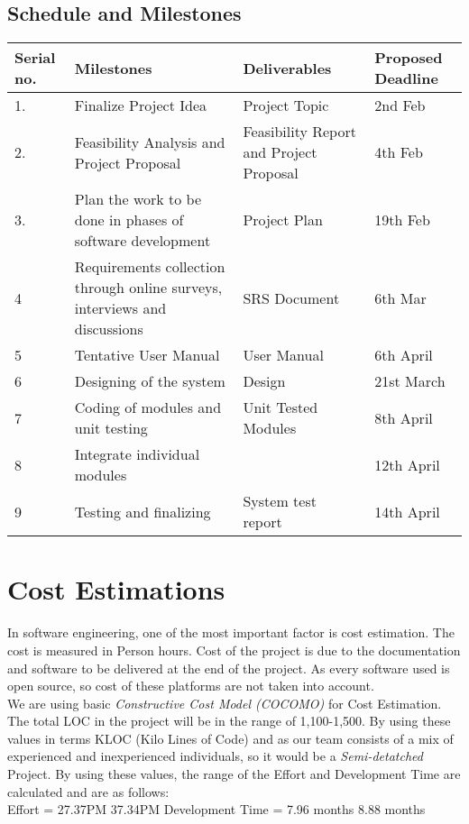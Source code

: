 \documentclass[
10pt, %
a4paper, %
oneside, %
headinclude,footinclude, %
BCOR5mm, %
]{scrartcl}
\begin{document}
\subsection{ Schedule and Milestones}
\begin{table}[htbp]
\setlength\tabcolsep{1pt}
\begin{tabular}{|| p{1cm}| p{6cm}| p{4cm}| p{3cm}||}
 \hline
Serial no. & Milestones & 	Deliverables & Proposed Deadline   \\ [1.5ex] 
 \hline\hline
 1. &	Finalize Project Idea &	Project Topic &	2nd Feb\\ 
 \hline
 2. &	Feasibility Analysis and Project Proposal &	Feasibility Report and Project Proposal	& 4th Feb \\
 \hline
 3. & Plan the work to be done in 
 phases of software development	& Project Plan & 19th Feb \\
 \hline
4 &	Requirements collection through online surveys, interviews and discussions
& SRS Document & 6th Mar \\
 \hline
5 &	Tentative User Manual &	User Manual	& 6th April\\
\hline
6 &	Designing of the system &	Design &	21st March\\
\hline
7 &	Coding of modules and unit testing & Unit Tested Modules &	8th April\\
\hline
8 &	Integrate individual modules	& &	12th April\\
\hline
9 &	Testing and finalizing &	System test report &	14th April\\[1ex] 
 \hline
\end{tabular}

\end{table}

\section{Cost Estimations}
In software engineering, one of the most important factor is cost estimation. The cost is measured in Person hours. Cost of the project is due to the documentation and software to be delivered at the end of the project. As every software used is open source, so cost of these platforms are not taken into account.\vspace{0.5cm}\\ We are using basic \textit{Constructive Cost Model (COCOMO)} for Cost Estimation.\vspace{0.5cm}
\\The total LOC in the project will be in the range of 1,100-1,500. By using these values in terms KLOC (Kilo Lines of Code) and as our team consists of a mix of experienced and inexperienced individuals, so it would be a \textit{Semi-detatched} Project.\vspace{0.5cm}
By using these values, the range of the Eﬀort and Development Time are calculated and are as follows:\vspace{0.5cm}
\\Eﬀort = 27.37PM 37.34PM Development Time = 7.96 months 8.88 months
\end{document}
